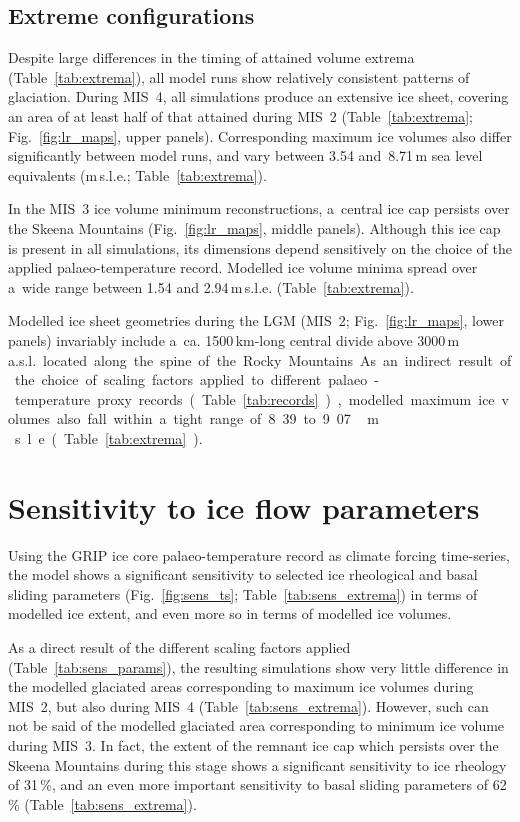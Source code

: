 \documentclass[tc, manuscript]{copernicus}
\begin{document}
\subsection{Extreme configurations}

      Despite large differences in the timing of attained volume extrema
      (Table~\ref{tab:extrema}), all model runs show relatively consistent
      patterns of glaciation. During MIS~4, all simulations produce an
      extensive ice sheet, covering an area of at least half of that
      attained during MIS~2 (Table~\ref{tab:extrema};
      Fig.~\ref{fig:lr_maps}, upper panels). Corresponding maximum ice
      volumes also differ significantly between model runs, and vary between
      3.54 and~8.71\,\unit{m} sea level equivalents (m\,s.l.e.;
      Table~\ref{tab:extrema}).

      In the MIS~3 ice volume minimum reconstructions, a~central ice cap
      persists over the Skeena Mountains (Fig.~\ref{fig:lr_maps}, middle
      panels). Although this ice cap is present in all simulations, its
      dimensions depend sensitively on the choice of the applied
      palaeo-temperature record. Modelled ice volume minima spread over
      a~wide range between 1.54 and 2.94\,\unit{m}\,s.l.e.
      (Table~\ref{tab:extrema}).

      Modelled ice sheet geometries during the LGM (MIS~2;
      Fig.~\ref{fig:lr_maps}, lower panels) invariably include a~ca.
      1500\,\unit{km}-long central divide above 3000\,\unit{m\,a.s.l.}
      located along the spine of the Rocky Mountains. As an indirect result
      of the choice of scaling factors applied to different
      palaeo-temperature proxy records (Table~\ref{tab:records}), modelled
      maximum ice volumes also fall within a~tight range of 8.39 to
      9.07\,\unit{m}\,s.l.e. (Table~\ref{tab:extrema}).


\section{Sensitivity to ice flow parameters}
\label{sec:sens}

      Using the GRIP ice core palaeo-temperature record as climate forcing
      time-series, the model shows a significant sensitivity to selected ice
      rheological and basal sliding parameters (Fig.~\ref{fig:sens_ts};
      Table~\ref{tab:sens_extrema}) in terms of modelled ice extent, and
      even more so in terms of modelled ice volumes.

      As a direct result of the different scaling factors applied
      (Table~\ref{tab:sens_params}), the resulting simulations show very
      little difference in the modelled glaciated areas corresponding to
      maximum ice volumes during MIS~2, but also during MIS~4
      (Table~\ref{tab:sens_extrema}). However, such can not be said of the
      modelled glaciated area corresponding to minimum ice volume during
      MIS~3. In fact, the extent of the remnant ice cap which persists over
      the Skeena Mountains during this stage shows a significant sensitivity
      to ice rheology of 31\,\unit{\%}, and an even more important
      sensitivity to basal sliding parameters of 62\,\unit{\%}
      (Table~\ref{tab:sens_extrema}).
\end{document}
